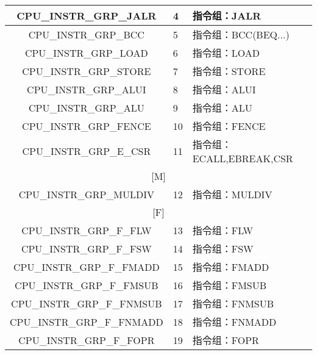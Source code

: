 \begin{center}
\begin{tabular}{|c|p{3cm}|p{6cm}|}
    CPU\_INSTR\_GRP\_JALR & 4 & 指令组：JALR\\\hline
    CPU\_INSTR\_GRP\_BCC & 5 & 指令组：BCC(BEQ...)\\\hline
    CPU\_INSTR\_GRP\_LOAD & 6 & 指令组：LOAD\\\hline
    CPU\_INSTR\_GRP\_STORE & 7 & 指令组：STORE\\\hline
    CPU\_INSTR\_GRP\_ALUI & 8 & 指令组：ALUI\\\hline
    CPU\_INSTR\_GRP\_ALU & 9 & 指令组：ALU\\\hline
    CPU\_INSTR\_GRP\_FENCE & 10 & 指令组：FENCE\\\hline
    CPU\_INSTR\_GRP\_E\_CSR & 11 & 指令组：ECALL,EBREAK,CSR\\\hline
    \multicolumn{3}{|c|}{[M]}\\\hline
    CPU\_INSTR\_GRP\_MULDIV & 12 & 指令组：MULDIV\\\hline
    \multicolumn{3}{|c|}{[F]}\\\hline
    CPU\_INSTR\_GRP\_F\_FLW & 13 & 指令组：FLW\\\hline
    CPU\_INSTR\_GRP\_F\_FSW & 14 & 指令组：FSW\\\hline
    CPU\_INSTR\_GRP\_F\_FMADD & 15 & 指令组：FMADD\\\hline
    CPU\_INSTR\_GRP\_F\_FMSUB & 16 & 指令组：FMSUB\\\hline
    CPU\_INSTR\_GRP\_F\_FNMSUB & 17 & 指令组：FNMSUB\\\hline
    CPU\_INSTR\_GRP\_F\_FNMADD & 18 & 指令组：FNMADD\\\hline
    CPU\_INSTR\_GRP\_F\_FOPR & 19 & 指令组：FOPR\\\hline
\end{tabular}
\end{center}